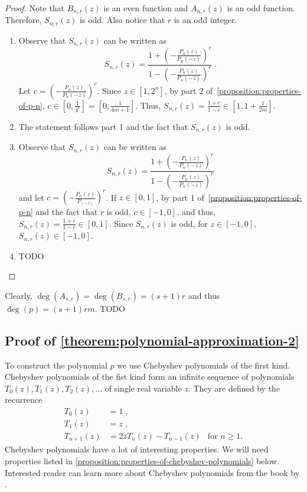 \documentclass[12pt]{article}
\begin{document}
\begin{proof}
Note that $B_{n,r}(z)$ is an even function and $A_{n,r}(z)$ is an odd function.
Therefore, $S_{n,r}(z)$ is odd. Also notice that $r$ is an odd integer.

\begin{enumerate}
\item Observe that $S_{n,r}(z)$ can be written as
$$
S_{n,r}(z) = \frac{1 + \left( - \frac{P_n(z)}{P_n(-z)}\right)^r}{1 - \left( - \frac{P_n(z)}{P_n(-z)}\right)^r} \; .
$$
Let $c = \left( - \frac{P_n(z)}{P_n(-z)}\right)^r$. Since $z \in [1,2^n]$, by
part 2 of~\autoref{proposition:properties-of-p-n}, $c \in [0,\frac{1}{4^r}] =
[0,\frac{1}{4m+1}]$. Thus, $S_{n,r}(z) = \frac{1+c}{1-c} \in [1,1 +
\frac{1}{2m}]$.

\item The statement follows part 1 and the fact that $S_{n,r}(z)$ is odd.

\item Observe that $S_{n,r}(z)$ can be written as
$$
S_{n,r}(z) = \frac{1 + \left( - \frac{P_n(z)}{P_n(-z)}\right)^r}{1 - \left( - \frac{P_n(z)}{P_n(-z)}\right)^r}
$$
and let $c = \left( - \frac{P_n(z)}{P_(-z)}\right)^r$. If $z \in [0,1]$, by part
1 of~\autoref{proposition:properties-of-p-n} and the fact that $r$ is odd, $c
\in [-1,0]$, and thus, $S_{n,r}(z) = \frac{1+c}{1-c} \in [0,1]$. Since
$S_{n,r}(z)$ is odd, for $z \in [-1,0]$, $S_{n,r}(z) \in [-1,0]$.

\item TODO

\end{enumerate}
\end{proof}

Clearly, $\deg(A_{s,r}) = \deg(B_{s,r}) = (s+1)r$ and thus $\deg(p) = (s+1)rm$.
TODO

\subsection{Proof of \autoref{theorem:polynomial-approximation-2}}
\label{section:proof-of-polynomial-approximation-2}

To construct the polynomial $p$ we use Chebyshev polynomials of the first kind.
Chebyshev polynomials of the fist kind form an infinite sequence of polynomials
$T_0(z), T_1(z), T_2(z), \dots$ of single real variable $z$. They are defined
by the recurrence
\begin{align*}
T_0(z) & = 1 \; , \\
T_1(z) & = z \; , \\
T_{n+1}(z) & = 2zT_n(z) - T_{n-1}(z) & \text{for $n \ge 1$.}
\end{align*}
Chebyshev polynomials have a lot of interesting properties.
We will need properties listed in
\autoref{proposition:properties-of-chebyshev-polynomials} below.
Interested reader can learn more about Chebyshev polynomials
from the book by \cite{Mason-Handscomb-2002}.
\end{document}
